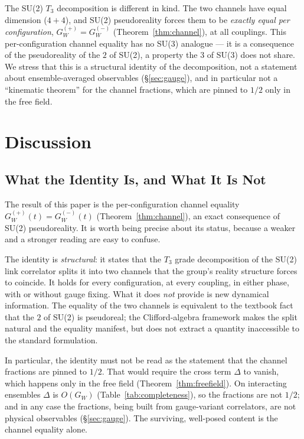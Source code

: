\documentclass[12pt,a4paper]{article}
\newcommand{\GW}[1]{G_W^{(#1)}}
\begin{document}
	The SU(2) $T_3$ decomposition is different in kind. The two channels have equal
	dimension ($4+4$), and SU(2) pseudoreality forces them to be \emph{exactly equal
	per configuration}, $\GW{+}=\GW{-}$ (Theorem~\ref{thm:channel}), at all couplings.
	This per-configuration channel equality has no SU(3) analogue --- it is a
	consequence of the pseudoreality of the $2$ of SU(2), a property the $3$ of SU(3)
	does not share. We stress that this is a structural identity of the decomposition,
	not a statement about ensemble-averaged observables (\S\ref{sec:gauge}), and in
	particular not a ``kinematic theorem'' for the channel fractions, which are pinned
	to $1/2$ only in the free field.
	
\section{Discussion}
	
	\subsection{What the Identity Is, and What It Is Not}
	\label{sec:nofraction}
	
	The result of this paper is the per-configuration channel equality
	$\GW{+}(t)=\GW{-}(t)$ (Theorem~\ref{thm:channel}), an exact consequence of SU(2)
	pseudoreality. It is worth being precise about its status, because a weaker and a
	stronger reading are easy to confuse.
	
	The identity is \emph{structural}: it states that the $T_3$ grade decomposition of
	the SU(2) link correlator splits it into two channels that the group's reality
	structure forces to coincide. It holds for every configuration, at every coupling,
	in either phase, with or without gauge fixing. What it does \emph{not} provide is
	new dynamical information. The equality of the two channels is equivalent to the
	textbook fact that the $2$ of SU(2) is pseudoreal; the Clifford-algebra framework
	makes the split natural and the equality manifest, but does not extract a quantity
	inaccessible to the standard formulation.
	
	In particular, the identity must not be read as the statement that the channel
	fractions are pinned to $1/2$. That would require the cross term $\Delta$ to vanish,
	which happens only in the free field (Theorem~\ref{thm:freefield}). On interacting
	ensembles $\Delta$ is $O(G_W)$ (Table~\ref{tab:completeness}), so the fractions are
	not $1/2$; and in any case the fractions, being built from gauge-variant correlators,
	are not physical observables (\S\ref{sec:gauge}). The surviving, well-posed content
	is the channel equality alone.
	
\end{document}
